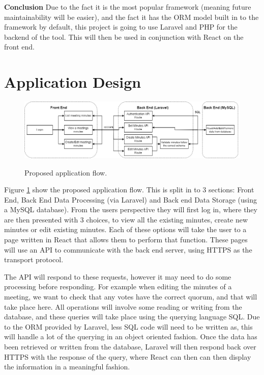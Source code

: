 \documentclass{UoYCSproject}
\begin{document}
\textbf{Conclusion}
\newline
Due to the fact it is the most popular framework (meaning future maintainability will be easier), and the fact it has the ORM model built in to the framework by default, this project is going to use Laravel and PHP for the backend of the tool. This will then be used in conjunction with React on the front end.

\section{Application Design}
\label{sec:application_design}

\begin{figure}[htb]
\begin{center}
\includegraphics[width=\textwidth]{"./assets/methodology-assets/Methodology - Flow Diagram v2.drawio.png"}
\label{fig:app_design}
\end{center}
\caption{Proposed application flow.}
\end{figure}

Figure \ref{fig:app_design} show the proposed application flow. This is split in to 3 sections: Front End, Back End Data Processing (via Laravel) and Back end Data Storage (using a MySQL database). From the users perspective they will first log in, where they are then presented with 3 choices, to view all the existing minutes, create new minutes or edit existing minutes. Each of these options will take the user to a page written in React that allows them to perform that function. These pages will use an API to communicate with the back end server, using HTTPS as the transport protocol.  

The API will respond to these requests, however it may need to do some processing before responding. For example when editing the minutes of a meeting, we want to check that any votes have the correct quorum, and that will take place here. All operations will involve some reading or writing from the database, and these queries will take place using the querying language SQL. Due to the ORM provided by Laravel, less SQL code will need to be written as, this will handle a lot of the querying in an object oriented fashion. Once the data has been retrieved or written from the database, Laravel will then respond back over HTTPS with the response of the query, where React can then can then display the information in a meaningful fashion.
\end{document}
